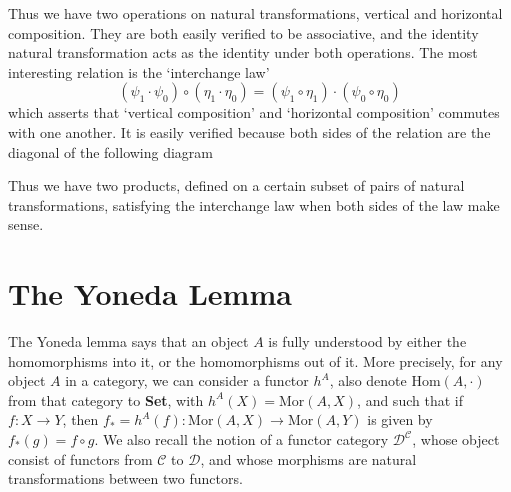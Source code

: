 Thus we have two operations on natural transformations, vertical and horizontal composition. They are both easily verified to be associative, and the identity natural transformation acts as the identity under both operations. The most interesting relation is the `interchange law'
%
\[ (\psi_1 \cdot \psi_0) \circ (\eta_1 \cdot \eta_0) = (\psi_1 \circ \eta_1) \cdot (\psi_0 \circ \eta_0) \]
%
which asserts that `vertical composition' and `horizontal composition' commutes with one another. It is easily verified because both sides of the relation are the diagonal of the following diagram
%
\begin{center}
\end{center}
%
Thus we have two products, defined on a certain subset of pairs of natural transformations, satisfying the interchange law when both sides of the law make sense. 





\section{The Yoneda Lemma}

The Yoneda lemma says that an object $A$ is fully understood by either the homomorphisms into it, or the homomorphisms out of it. More precisely, for any object $A$ in a category, we can consider a functor $h^A$, also denote $\text{Hom}(A,\cdot)$ from that category to {\bf Set}, with $h^A(X) = \text{Mor}(A,X)$, and such that if $f: X \to Y$, then $f_* = h^A(f): \text{Mor}(A,X) \to \text{Mor}(A,Y)$ is given by $f_*(g) = f \circ g$. We also recall the notion of a functor category $\mathcal{D}^{\mathcal{C}}$, whose object consist of functors from $\mathcal{C}$ to $\mathcal{D}$, and whose morphisms are natural transformations between two functors.

